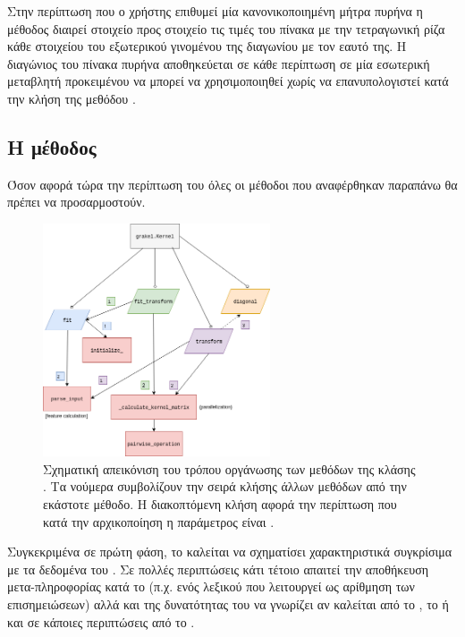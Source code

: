 Στην περίπτωση που ο χρήστης επιθυμεί μία κανονικοποιημένη μήτρα πυρήνα η μέθοδος \texttt{} διαιρεί στοιχείο προς στοιχείο τις τιμές του πίνακα με την τετραγωνική ρίζα κάθε στοιχείου του εξωτερικού γινομένου της διαγωνίου με τον εαυτό της.
Η διαγώνιος του πίνακα πυρήνα αποθηκεύεται σε κάθε περίπτωση σε μία εσωτερική μεταβλητή προκειμένου να μπορεί να χρησιμοποιηθεί χωρίς να επανυπολογιστεί κατά την κλήση της μεθόδου \texttt{}.
\subsection{Η μέθοδος \texttt{}}
Όσον αφορά τώρα την περίπτωση του \texttt{} όλες οι μέθοδοι που αναφέρθηκαν παραπάνω θα πρέπει να προσαρμοστούν.
\begin{figure}[]
    \centering
    \includegraphics[width=0.6\textwidth]{figures/KernelStructure.png}
    \caption[Σχηματική απεικόνιση του τρόπου οργάνωσης των μεθόδων της κλάσης .]{Σχηματική απεικόνιση του τρόπου οργάνωσης των μεθόδων της κλάσης . Τα νούμερα συμβολίζουν την σειρά κλήσης άλλων μεθόδων από την εκάστοτε μέθοδο. Η διακοπτόμενη κλήση αφορά την περίπτωση που κατά την αρχικοποίηση η παράμετρος  είναι .}
    \label{fig:kernel_structure}
\end{figure}
Συγκεκριμένα σε πρώτη φάση, το \texttt{} καλείται να σχηματίσει χαρακτηριστικά συγκρίσιμα με τα δεδομένα του \texttt{}.
Σε πολλές περιπτώσεις κάτι τέτοιο απαιτεί την αποθήκευση μετα-πληροφορίας κατά το \texttt{} (π.χ. ενός λεξικού που λειτουργεί ως αρίθμηση των επισημειώσεων) αλλά και της δυνατότητας του \texttt{} να γνωρίζει αν καλείται από το \texttt{}, το \texttt{} ή και σε κάποιες περιπτώσεις από το \texttt{}.
